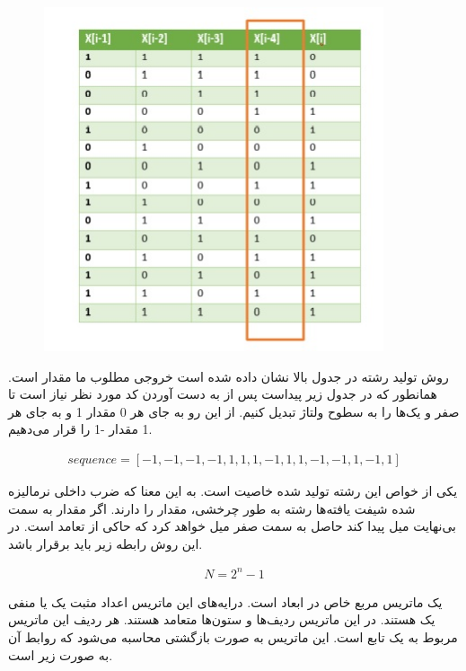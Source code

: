 {\begin{figure}[H]
    \includegraphics[width=10cm]{Images/PN_Table.jpg}
    \centering
    \caption{}
\end{figure}

روش تولید رشته در جدول بالا نشان داده شده است خروجی مطلوب ما مقدار
است.
همانطور که در جدول زیر پیداست پس از به دست آوردن کد مورد نظر نیاز است تا صفر و یک‌ها را به سطوح ولتاژ تبدیل کنیم. از این رو به جای هر 0 مقدار 1 و به جای هر 1 مقدار -1 را قرار می‌دهیم.

\begin{equation*}
\begin{aligned}
    sequence = [-1,-1,-1,-1,1,1,1,-1,1,1,-1,-1,1,-1,1]
\end{aligned}
\end{equation*}

یکی از خواص این رشته تولید شده خاصیت
است. به این معنا که ضرب داخلی نرمالیزه شده شیفت یافته‌ها رشته به طور چرخشی، مقدار
را دارند.
اگر مقدار
به سمت بی‌نهایت میل پیدا کند حاصل به سمت صفر میل خواهد کرد که حاکی از تعامد است.
در این روش رابطه زیر باید برقرار باشد.

\begin{equation*}
\begin{aligned}
    N = 2^n - 1
\end{aligned}
\end{equation*}


\newpage
{}
یک ماتریس مربع خاص در ابعاد
است.
درایه‌های این ماتریس اعداد مثبت یک یا منفی یک هستند.
در این ماتریس ردیف‌ها و ستون‌ها متعامد هستند.
هر ردیف این ماتریس مربوط به یک تابع
است.
این ماتریس به صورت بازگشتی محاسبه می‌شود که روابط آن به صورت زیر است.

}
